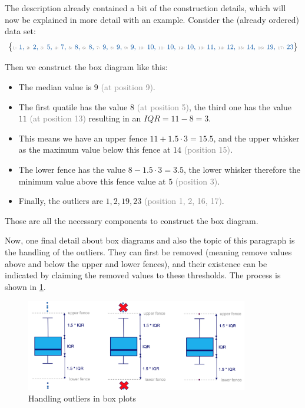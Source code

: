 \begin{note}
The description already contained a bit of the construction details, which will now be explained in more detail with an example. Consider the (already ordered) data set:
\begin{align*}
  \big\{
  \text{\textcolor{mathblue}{\small {\tiny \color{gray} 1: }1, {\tiny \color{gray} 2: }2, {\tiny \color{gray} 3: }5, {\tiny \color{gray} 4: }7, {\tiny \color{gray} 5: }8, {\tiny \color{gray} 6: }8, {\tiny \color{gray} 7: }9, {\tiny \color{gray} 8: }9, {\tiny \color{gray} 9: }9, {\tiny \color{gray} 10: }10, {\tiny \color{gray} 11: }10, {\tiny \color{gray} 12: }10, {\tiny \color{gray} 13: }11, {\tiny \color{gray} 14: }12, {\tiny \color{gray} 15: }14, {\tiny \color{gray} 16: }19, {\tiny \color{gray} 17: }23}}
  \big\}
\end{align*}
 
Then we construct the box diagram like this:
\begin{itemize}
  \item The median value is $9$ \textcolor{gray}{\tiny(at position 9)}.
  \item The first quatile has the value $8$ \textcolor{gray}{\tiny(at position 5)}, the third one has the value $11$ \textcolor{gray}{\tiny(at position 13)} resulting in an $IQR = 11-8 = 3$.
  \item This means we have an upper fence $11 + 1.5\cdot3 = 15.5$, and the upper whisker as the maximum value below this fence at $14$ \textcolor{gray}{\tiny(position 15)}.
  \item The lower fence has the value $8 - 1.5\cdot3 = 3.5$, the lower whisker therefore the minimum value above this fence value at $5$ \textcolor{gray}{\tiny(position 3)}.
  \item Finally, the outliers are $1, 2, 19, 23$ \textcolor{gray}{\tiny(position 1, 2, 16, 17)}.
\end{itemize}
Those are all the necessary components to construct the box diagram.
\end{note}

Now, one final detail about box diagrams and also the topic of this paragraph is the handling of the outliers. They can first be removed (meaning remove values above and below the upper and lower fences), and their existence can be indicated by claiming the removed values to these thresholds. The process is shown in \ref{fig:2_box_plot_outlier_handling}.

\begin{figure}[h]
  \centering
  \includegraphics[height=4cm]{assets/visualization_and_extraction/box_outliers.png}
  \caption{Handling outliers in box plots}
  \label{fig:2_box_plot_outlier_handling}
\end{figure}